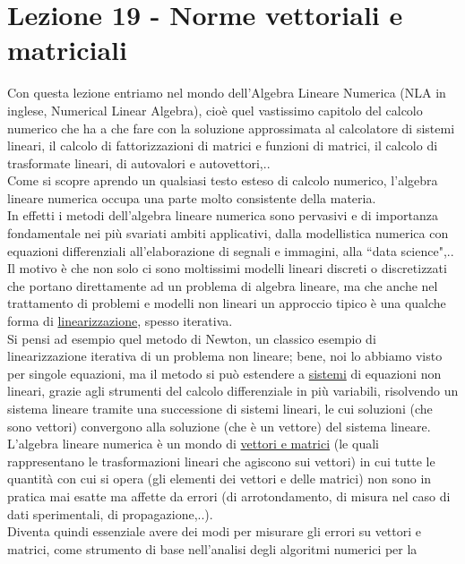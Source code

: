 \documentclass[12pt,a4paper]{article}
\begin{document}
\section{Lezione 19 - Norme vettoriali e matriciali}
Con questa lezione entriamo nel mondo dell'Algebra Lineare Numerica (NLA in inglese, Numerical Linear Algebra), cioè quel vastissimo capitolo del calcolo numerico che ha a che fare con la soluzione approssimata al calcolatore di sistemi lineari, il calcolo di fattorizzazioni di matrici
e funzioni di matrici, il calcolo di trasformate lineari, di autovalori e autovettori,..\\Come si scopre aprendo un qualsiasi testo esteso di calcolo numerico, l'algebra lineare numerica occupa una parte molto consistente della materia.\\In effetti i metodi dell'algebra lineare numerica sono pervasivi e di importanza fondamentale nei più svariati ambiti applicativi, dalla modellistica numerica con equazioni differenziali all'elaborazione di
segnali e immagini, alla ``data science",..\\Il motivo è che non solo ci sono moltissimi modelli lineari discreti o discretizzati che portano direttamente ad un problema di algebra lineare, ma che anche nel trattamento di problemi e modelli non lineari un approccio tipico è una qualche forma di \uline{linearizzazione}, spesso iterativa.\\Si pensi ad esempio quel metodo di Newton, un classico esempio di linearizzazione iterativa di un problema non lineare; bene,
noi lo abbiamo visto per singole equazioni, ma il metodo si può estendere a \uline{sistemi} di equazioni non lineari, grazie agli strumenti del calcolo differenziale in più variabili, risolvendo un sistema lineare tramite una successione di sistemi lineari, le cui soluzioni (che sono vettori) convergono alla soluzione (che è un vettore) del sistema lineare.\\L'algebra lineare numerica è un mondo di \uline{vettori e matrici}
(le quali rappresentano  le trasformazioni lineari che agiscono sui vettori) in cui tutte le quantità con cui si opera (gli elementi dei vettori e delle matrici) non sono in pratica mai esatte ma affette da errori (di arrotondamento, di misura nel caso di dati sperimentali, di propagazione,..).\\Diventa quindi essenziale avere dei modi per misurare gli errori su vettori e matrici, come strumento di base nell'analisi degli algoritmi numerici per la
\end{document}
